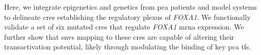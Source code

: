 Here, we integrate epigenetics and genetics from \gls{pca} patients and model systems to delineate \glspl{cre} establishing the regulatory plexus of \emph{FOXA1}.
We functionally validate a set of six mutated \glspl{cre} that regulate \emph{FOXA1} \gls{mrna} expression.
We further show that \glspl{snv} mapping to these \glspl{cre} are capable of altering their transactivation potential, likely through modulating the binding of key \gls{pca} \glspl{tf}.
